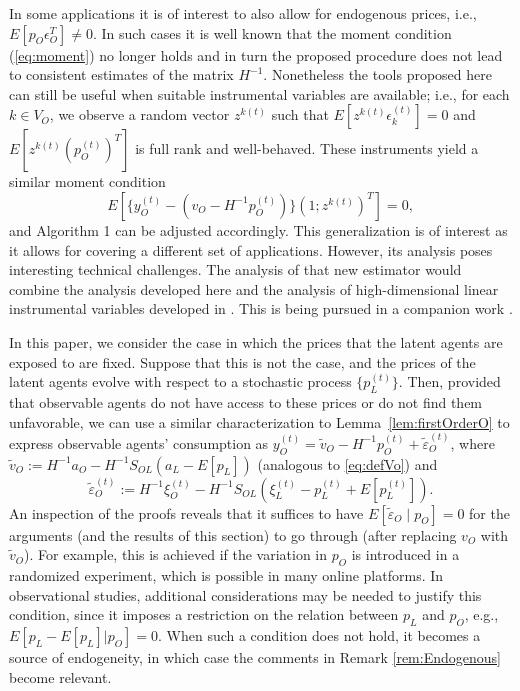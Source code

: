 \documentclass[opre,nonblindrev]{informs3} %
\begin{document}
{
\begin{remark} \label{rem:Endogenous}
In some applications it is of interest to also allow for endogenous prices, i.e., $E[p_O\epsilon_O^T] \neq 0$. In such cases it is well known that the moment condition (\ref{eq:moment}) no longer holds and in turn the proposed procedure does not lead to consistent estimates of the matrix $H^{-1}$. Nonetheless the tools proposed here can still be useful when suitable instrumental variables are available; i.e., for each $k \in V_O$, we observe a random vector $z^{k(t)}$ such that $E[z^{k(t)}\epsilon_k^{(t)}] = 0$ and $E[z^{k(t)}(p_O^{(t)})^T]$ is full rank and well-behaved. These instruments  yield a similar moment condition
\begin{equation}\label{eq:momentZ}
{E}[\{y_O^{(t)} - (v_O - H^{-1}p_O^{(t)})\}(1;z^{k(t)})^T]=0,
\end{equation}
and Algorithm 1 can be adjusted accordingly.  This generalization is of interest as it allows for covering a different set of applications. However, its analysis poses interesting technical challenges. The analysis of that new estimator would combine the analysis developed here and the analysis of high-dimensional linear instrumental variables developed in \cite{belloni2017simultaneous}. This is being pursued in a companion work \citet{ata2018IVnetwork}.
	\hfill \Halmos
\end{remark}
}



{
\begin{remark}
	{In this paper, we consider the case in which the prices that the latent agents are exposed to are fixed. 
	Suppose that this is not the case, and the prices of the latent agents evolve with respect to a  stochastic process $\{p_L^{(t)}\}$.
	Then,
provided that observable agents do not have access to these prices or do not find them unfavorable,
	we can use a similar characterization to Lemma~\ref{lem:firstOrderO} to express observable agents' consumption as
	${y}_O^{(t)}=\tilde{v}_O-H^{-1} {p}_O^{(t)}+\tilde{ \varepsilon}_O^{(t)}$, where
	$\tilde{v}_O := H^{-1}  {a}_O-H^{-1} S_{OL} ( {a}_L - E[{p}_L])$
	(analogous to \eqref{eq:defVo}) and
	  $$\tilde{ \varepsilon}_O^{(t)}:= 
	 H^{-1} \xi_O^{(t)}-H^{-1} S_{OL}  ({\xi}^{(t)}_L
	 -p_L^{(t)}+  E[{p}_L^{(t)}])
	 .$$
	An inspection of the proofs reveals that 
	it suffices to have
	 $E[\tilde\varepsilon_{O}\mid p_O ] = 0$ 
	 for the arguments 
	 (and the results of this section) to go through 
	(after replacing 
$v_O$ with $\tilde{v}_O$).
For example, this is achieved if the variation in $p_O$ is introduced in a randomized experiment, which is possible in many online platforms.
In observational studies, additional considerations may be needed to justify this condition,
since 
 it imposes a restriction on the relation between $p_L$ and $p_O$, e.g., $E[ p_L - E[p_L] | p_O ] = 0$.
 When such a condition does not hold, it becomes a source of endogeneity, in which case the comments in Remark  \ref{rem:Endogenous} become relevant.
 } \hfill\Halmos
\end{remark}		
}
\end{document}
